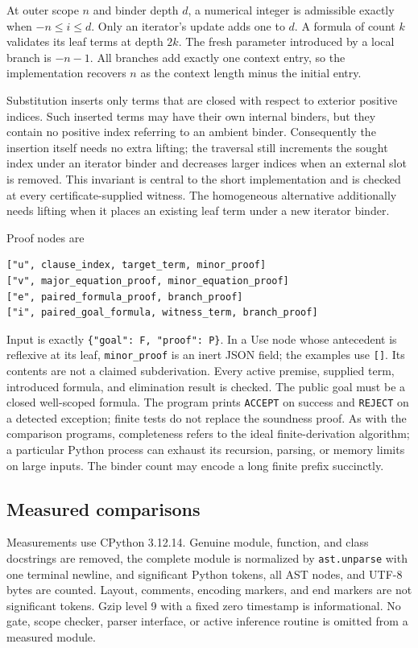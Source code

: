 \documentclass[11pt]{article}
\theoremstyle{definition}\newtheorem{definition}[theorem]{Definition}
\theoremstyle{remark}\newtheorem{remark}[theorem]{Remark}
\newcommand{\code}[1]{\texttt{#1}}
\begin{document}
At outer scope $n$ and binder depth $d$, a numerical integer is admissible
exactly when $-n\le i\le d$. Only an iterator's update adds one to $d$.
A formula of count $k$ validates its leaf terms at depth $2k$.
The fresh parameter introduced by a local branch is $-n-1$.
All branches add exactly one context entry, so the implementation recovers
$n$ as the context length minus the initial entry.

Substitution inserts only terms that are closed with respect to exterior
positive indices. Such inserted terms may have their own internal
binders, but they contain no positive index referring to an ambient binder.
Consequently the insertion itself needs no extra lifting; the traversal
still increments the sought index under an iterator binder and decreases
larger indices when an external slot is removed. This invariant is central
to the short implementation and is checked at every certificate-supplied
witness. The homogeneous alternative additionally needs lifting when it
places an existing leaf term under a new iterator binder.

Proof nodes are
\begin{lstlisting}
["u", clause_index, target_term, minor_proof]
["v", major_equation_proof, minor_equation_proof]
["e", paired_formula_proof, branch_proof]
["i", paired_goal_formula, witness_term, branch_proof]
\end{lstlisting}
Input is exactly \code{\{"goal": F, "proof": P\}}. In a Use node whose
antecedent is reflexive at its leaf, \code{minor\_proof} is an inert JSON
field; the examples use \code{[]}. Its contents are not a claimed
subderivation. Every active premise, supplied term, introduced formula,
and elimination result is checked. The public goal must be a closed
well-scoped formula. The program prints \code{ACCEPT} on success and
\code{REJECT} on a detected exception; finite tests do not replace the
soundness proof. As with the comparison programs, completeness refers
to the ideal finite-derivation algorithm; a particular Python process
can exhaust its recursion, parsing, or memory limits on large inputs.
The binder count may encode a long finite prefix succinctly.

\subsection{Measured comparisons}

Measurements use CPython 3.12.14. Genuine module, function, and class
docstrings are removed, the complete module is normalized by
\code{ast.unparse} with one terminal newline, and significant Python
tokens, all AST nodes, and UTF-8 bytes are counted. Layout, comments,
encoding markers, and end markers are not significant tokens. Gzip level
9 with a fixed zero timestamp is informational. No gate, scope checker,
parser interface, or active inference routine is omitted from a measured
module.
\end{document}

